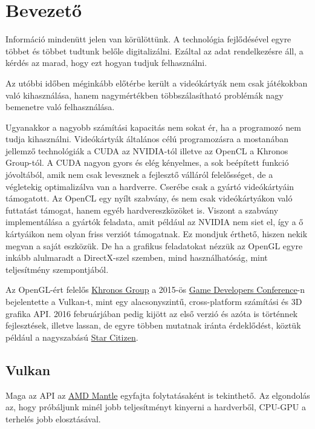 
\section{Bevezet\H o}
Inform\'aci\'o minden\"utt jelen van k\"or\"ul\"ott\"unk. A technol\'ogia fejl\H od\'es\'evel egyre t\"obbet \'es t\"obbet tudtunk bel\H ole digitaliz\'alni. Ez\'altal az adat rendelkez\'esre \'all, a k\'erd\'es az marad, hogy ezt hogyan tudjuk felhaszn\'alni.

Az ut\'obbi id\H oben m\'egink\'abb el\H ot\'erbe ker\"ult a vide\'ok\'arty\'ak nem csak j\'at\'ekokban val\'o kihaszn\'al\'asa, hanem nagym\'ert\'ekben t\"obbsz\'alas\'ithat\'o probl\'em\'ak nagy bemenetre val\'o felhaszn\'al\'asa. 

Ugyanakkor a nagyobb sz\'am\'it\'asi kapacit\'as nem sokat \'er, ha a programoz\'o nem tudja kihaszn\'alni.
Vide\'ok\'arty\'ak \'altal\'anos c\'el\'u programoz\'asra a mostan\'aban jellemz\H o technol\'ogi\'ak a CUDA az NVIDIA-t\'ol illetve az OpenCL a Khronos Group-t\'ol. A CUDA nagyon gyors \'es el\'eg k\'enyelmes, a sok be\'ep\'itett funkci\'o j\'ovolt\'ab\'ol, amik nem csak levesznek a fejleszt\H o v\'all\'ar\'ol felel\H oss\'eget, de a v\'egletekig optimaliz\'alva van a hardverre. Cser\'ebe csak a gy\'art\'o vide\'ok\'arty\'ain t\'amogatott.
Az OpenCL egy ny\'ilt szabv\'any, \'es nem csak vide\'ok\'arty\'akon val\'o futtat\'ast t\'amogat, hanem egy\'eb hardvereszk\"oz\"oket is. Viszont a szabv\'any implement\'al\'asa a gy\'art\'ok feladata, amit p\'eld\'aul az NVIDIA nem siet el, \'igy a \H o k\'arty\'aikon nem olyan friss verzi\'ot t\'amogatnak. Ez mondjuk \'erthet\H o, hiszen nekik megvan a saj\'at eszk\"oz\"uk.
De ha a grafikus feladatokat n\'ezz\"uk az OpenGL egyre ink\'abb alulmaradt a DirectX-szel szemben, mind haszn\'alhat\'os\'ag, mint teljes\'itm\'eny szempontj\'ab\'ol.

Az OpenGL-\'ert felel\H os \href{https://www.khronos.org/}{Khronos Group} a 2015-\"os \href{http://www.gdconf.com/}{Game Developers Conference}-n bejelentette a Vulkan-t, mint egy alacsonyszint\H u, cross-platform sz\'am\'it\'asi \'es 3D grafika API.
2016 febru\'arj\'aban pedig kij\"ott az els\H o verzi\'o \'es az\'ota is t\"ort\'ennek fejleszt\'esek, illetve lassan, de egyre t\"obben mutatnak ir\'anta \'erdekl\H od\'est, k\"ozt\"uk p\'eld\'aul a nagyszab\'as\'u \href{https://robertsspaceindustries.com/star-citizen}{Star Citizen}.

\subsection{Vulkan}
Maga az API az \href{https://www.amd.com/en-us/innovations/software-technologies/mantle}{AMD Mantle} egyfajta folytat\'asak\'ent is tekinthet\H o. Az elgondol\'as az, hogy pr\'ob\'aljunk min\'el jobb teljes\'itm\'enyt kinyerni a hardverb\H ol, CPU-GPU a terhel\'es jobb eloszt\'as\'aval.

